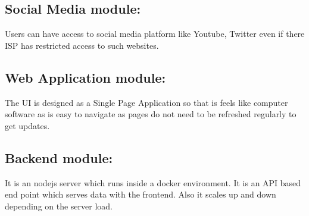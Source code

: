 \subsection{Social Media module:}

 Users can have access to social media platform like Youtube, Twitter even if there ISP has restricted access to such websites.


\subsection{Web Application module:}

The UI is designed as a Single Page Application so that is feels like computer software as is easy to navigate as pages do not need to be refreshed regularly to get updates.






\subsection{Backend module:}

It is an nodejs server which runs inside a docker environment. It is an API based end point which serves data with the frontend. Also it scales up and down depending on the server load. 

